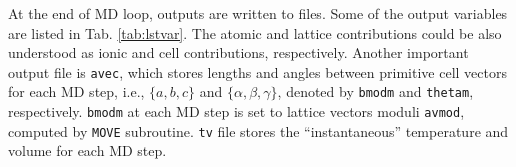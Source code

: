 At the end of MD loop, outputs are written to files.
Some of the output variables are listed in Tab. \ref{tab:lstvar}.
The atomic and lattice contributions could be also understood as
ionic and cell contributions, respectively. Another
important output file is \texttt{avec}, which stores lengths and angles
between primitive cell vectors for each MD step, i.e.,
$\{a, b, c\}$ and $\{\alpha, \beta, \gamma\}$,
denoted by \texttt{bmodm} and
\texttt{thetam}, respectively.
\texttt{bmodm} at each MD step
is set to lattice vectors moduli \texttt{avmod}, computed by \texttt{MOVE} subroutine.
\texttt{tv} file stores the ``instantaneous'' temperature and volume
for each MD step.
